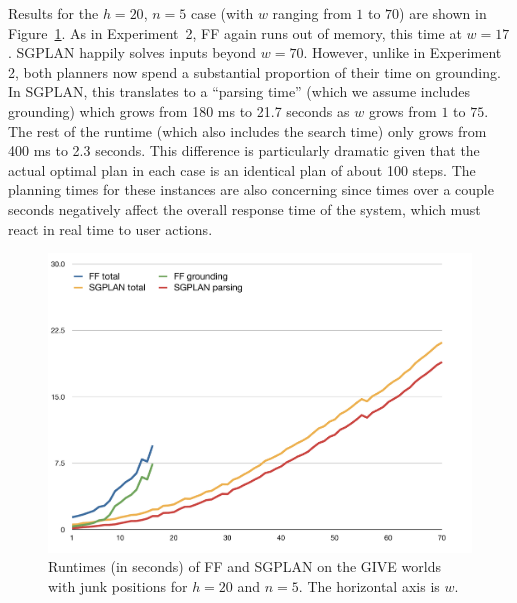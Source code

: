 Results for the $h=20$, $n=5$ case (with $w$ ranging from $1$ to $70$)
are shown in Figure~\ref{fig:give-runtime-junk}. As in Experiment~2,
FF again runs out of memory, this time at $w=17$. SGPLAN happily
solves inputs beyond $w=70$. However, unlike in Experiment 2, both
planners now spend a substantial proportion of their time on
grounding. In SGPLAN, this translates to a ``parsing time'' (which we
assume includes grounding) which grows from 180 ms to 21.7 seconds as
$w$ grows from $1$ to $75$. The rest of the runtime (which also
includes the search time) only grows from 400 ms to 2.3 seconds. This
difference is particularly dramatic given that the actual optimal plan
in each case is an identical plan of about 100 steps. The planning
times for these instances are also concerning since times over a
couple seconds negatively affect the overall response time of the
system, which must react in real time to user actions.

\begin{figure}
  \centering
  \includegraphics[width=1\columnwidth]{pic-runtime-empty-world}
  \caption{Runtimes (in seconds) of FF and SGPLAN on the GIVE worlds with junk
    positions for $h=20$ and $n=5$. The horizontal axis is $w$.}
  \label{fig:give-runtime-junk}
\end{figure}


